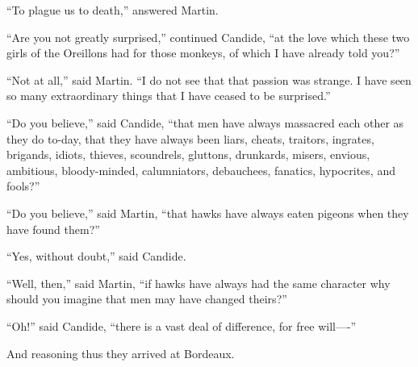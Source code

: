 ``To plague us to death,'' answered Martin.

``Are you not greatly surprised,'' continued Candide, ``at the love which these two girls of the Oreillons had for those monkeys, of which I have already told you?''

``Not at all,'' said Martin. ``I do not see that that passion was strange. I have seen so many extraordinary things that I have ceased to be surprised.''

``Do you believe,'' said Candide, ``that men have always massacred each other as they do to-day, that they have always been liars, cheats, traitors, ingrates, brigands, idiots, thieves, scoundrels, gluttons, drunkards, misers, envious, ambitious, bloody-minded, calumniators, debauchees, fanatics, hypocrites, and fools?''

``Do you believe,'' said Martin, ``that hawks have always eaten pigeons when they have found them?''

``Yes, without doubt,'' said Candide.

``Well, then,'' said Martin, ``if hawks have always had the same character why should you imagine that men may have changed theirs?''

``Oh!'' said Candide, ``there is a vast deal of difference, for free will----''

And reasoning thus they arrived at Bordeaux.

